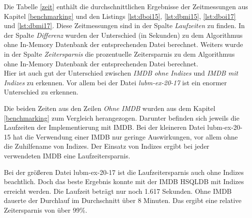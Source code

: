 \documentclass[draft,final]{vutinfth} %
\begin{document}
Die Tabelle \ref{zeit} enthält die durchschnittlichen Ergebnisse der Zeitmessungen aus Kapitel \ref{benchmarking} und den Listings \ref{lst:dboi15}, \ref{lst:dbmi15}, \ref{lst:dboi17} und \ref{lst:dbmi17}. Diese Zeitmessungen sind in der Spalte \textit{Laufzeiten} zu finden. In der Spalte \textit{Differenz} wurden der Unterschied (in Sekunden) zu dem Algorithmus ohne In-Memory Datenbank der entsprechenden Datei berechnet. Weiters wurde in der Spalte \textit{Zeitersparnis} die prozentuelle Zeitersparnis zu dem Algorithmus ohne In-Memory Datenbank der entsprechenden Datei berechnet. \\
Hier ist auch gut der Unterschied zwischen \textit{IMDB ohne Indizes} und \textit{IMDB mit Indizes} zu erkennen. Vor allem bei der Datei \textit{lubm-ex-20-17} ist ein enormer Unterschied zu erkennen.

Die beiden Zeiten aus den Zeilen \textit{Ohne IMDB} wurden aus dem Kapitel \ref{benchmarking} zum Vergleich herangezogen. Darunter befinden sich jeweils die Laufzeiten der Implementierung mit IMDB. Bei der kleineren Datei lubm-ex-20-15 hat die Verwendung einer IMDB nur geringe Auswirkungen, vor allem ohne die Zuhilfename von Indizes. Der Einsatz von Indizes ergibt bei jeder verwendeten IMDB eine Laufzeitersparnis. 

Bei der grö\ss eren Datei lubm-ex-20-17 ist die Laufzeitersparnis auch ohne Indizes beachtlich. Doch das beste Ergebnis konnte mit der IMDB HSQLDB mit Indizes erreicht werden. Die Laufzeit beträgt nur noch 1.617 Sekunden. Ohne IMDB dauerte der Durchlauf im Durchschnitt über 8 Minuten. Das ergibt eine relative Zeitersparnis von über 99\%.  
\end{document}

